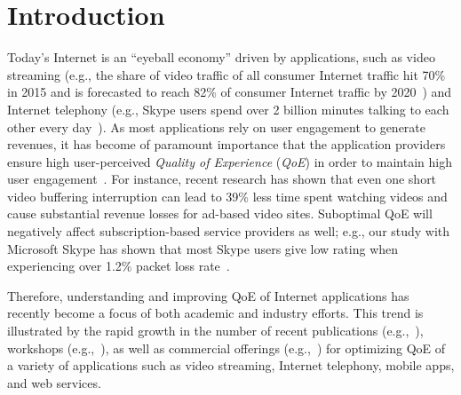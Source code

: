 \chapter{Introduction}


Today's Internet is an ``eyeball economy'' driven by applications, such 
as video streaming (e.g., the share of video traffic of all consumer Internet 
traffic  hit 70\% in 2015 and is forecasted to reach 82\% of consumer Internet traffic by 
2020~\cite{cisco-forecast-2015}) and Internet telephony (e.g., Skype users spend over 
2 billion minutes talking to each other every day~\cite{skype-2-billion-minutes}). 
As most applications rely on user engagement to generate revenues, 
it has become of paramount importance that the
application providers ensure high user-perceived 
{\em Quality of Experience} ({\em QoE}) in order to maintain high user 
engagement~\cite{sigcomm13athula}.
For instance, recent research has shown that even one short video buffering 
interruption can lead to 39\% less time spent watching videos and 
cause substantial  revenue losses for ad-based video sites. 
Suboptimal QoE will negatively affect subscription-based 
service providers as well; e.g., our study with Microsoft Skype 
has shown that most Skype  users give low rating when experiencing over
1.2\% packet loss rate~\cite{via}.

Therefore, understanding and improving QoE of Internet applications 
has recently become a focus of both academic and industry efforts. 
This trend is illustrated by the rapid growth in the number of recent
publications (e.g.,~\cite{sigcomm13athula,sigcomm12,
wang2014speedy,sigcomm11,eona,krishnan2013video}), workshops 
(e.g.,~\cite{workshop-wmust,workshop-fhmn,workshop-qoe}), 
as well as commercial offerings (e.g.,~\cite{conviva,artizanetworks}) for optimizing QoE 
of a variety of applications such as video streaming, Internet telephony, mobile 
apps, and web services.



